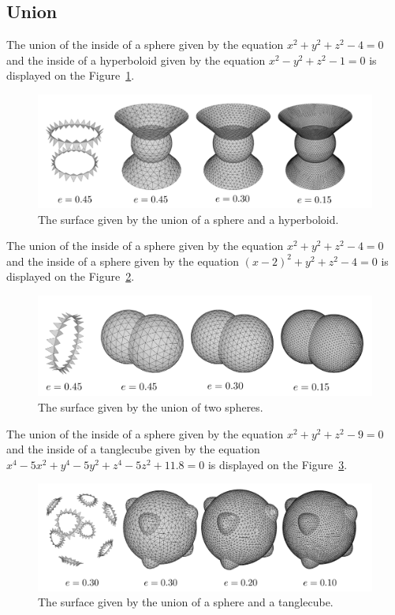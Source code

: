 \subsection{Union}
The union of the inside of a sphere given by the equation
$x^2+y^2+z^2-4=0$ and the inside of a hyperboloid given by the 
equation $x^2-y^2+z^2-1=0$ is displayed on the Figure~\ref{img:77}.
\begin{figure}[h!]
    \centerline{\includegraphics[scale=0.5]{images/img77}}
    \caption[The surface given by the union of a sphere and a hyperboloid]
    {The surface given by the union of a sphere and a hyperboloid.}
    \label{img:77}
\end{figure}
The union of the inside of a sphere given by the equation
$x^2+y^2+z^2-4=0$ and the inside of a sphere given by the 
equation $(x-2)^2+y^2+z^2-4=0$ is displayed on the Figure~\ref{img:78}.
\begin{figure}[h!]
    \centerline{\includegraphics[scale=0.5]{images/img78}}
    \caption[The surface given by the union of two spheres]
    {The surface given by the union of two spheres.}
    \label{img:78}
\end{figure}
The union of the inside of a sphere given by the equation
$x^2+y^2+z^2-9=0$ and the inside of a tanglecube given by the 
equation $x^4-5x^2+y^4-5y^2+z^4-5z^2+11.8=0$ is displayed on the Figure~\ref{img:79}.
\begin{figure}[h!]
    \centerline{\includegraphics[scale=0.5]{images/img79}}
    \caption[The surface given by the union of a sphere and a tanglecube]
    {The surface given by the union of a sphere and a tanglecube.}
    \label{img:79}
\end{figure}

